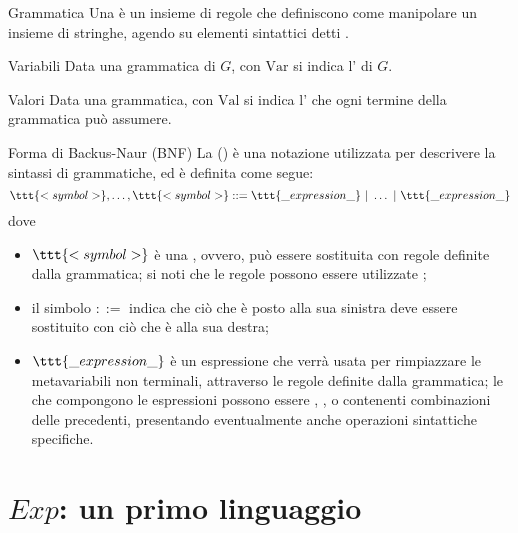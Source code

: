 \documentclass[a4paper, 12pt]{report}
\begin{document}
    \begin{frameddefn}{Grammatica}
        Una  è un insieme di regole che definiscono come manipolare un insieme di stringhe, agendo su elementi sintattici detti .
    \end{frameddefn}

    \begin{frameddefn}{Variabili}
        Data una grammatica di $G$, con $\mathrm{Var}$ si indica l' di $G$.
    \end{frameddefn}

    \begin{frameddefn}{Valori}
        Data una grammatica, con $\mathrm{Val}$ si indica l' che ogni termine della grammatica può assumere.
    \end{frameddefn}

    \begin{frameddefn}{Forma di Backus-Naur (BNF)}
        La  () è una notazione utilizzata per descrivere la sintassi di grammatiche, ed è definita come segue: $$\ttt{<symbol>}, \ldots, \ttt{<symbol>} ::= \ttt{\_expression\_} \ | \ \ldots \ | \ \ttt{\_expression\_}$$ dove
        \begin{itemize}
            \item $\ttt{<symbol>}$ è una , ovvero, può essere sostituita con regole definite dalla grammatica; si noti che le regole possono essere utilizzate ;
            \item il simbolo $::=$ indica che ciò che è posto alla sua sinistra deve essere sostituito con ciò che è alla sua destra;
            \item $\ttt{\_expression\_}$ è un espressione che verrà usata per rimpiazzare le metavariabili non terminali, attraverso le regole definite dalla grammatica; le  che compongono le espressioni possono essere , ,  o  contenenti combinazioni delle precedenti, presentando eventualmente anche operazioni sintattiche specifiche.
        \end{itemize}
    \end{frameddefn}

    \section{$Exp$: un primo linguaggio}
\end{document}
